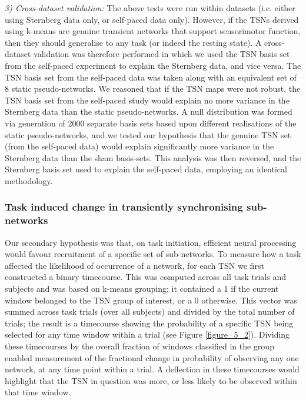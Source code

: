 \textit{3) Cross-dataset validation:}
The above tests were run within datasets (i.e. either using Sternberg data only, or self-paced data only). However, if the TSNs derived using k-means are genuine transient networks that support sensorimotor function, then they should generalise to any task (or indeed the resting state). A cross-dataset validation was therefore performed in which we used the TSN basis set from the self-paced experiment to explain the Sternberg data, and vice versa. The TSN basis set from the self-paced data was taken along with an equivalent set of 8 static pseudo-networks. We reasoned that if the TSN maps were not robust, the TSN basis set from the self-paced study would explain no more variance in the Sternberg data than the static pseudo-networks. A null distribution was formed via generation of 2000 separate basis sets based upon different realisations of the static pseudo-networks, and we tested our hypothesis that the genuine TSN set (from the self-paced data) would explain significantly more variance in the Sternberg data than the sham basis-sets. This analysis was then reversed, and the Sternberg basis set used to explain the self-paced data, employing an identical methodology.

\subsubsection{Task induced change in transiently synchronising sub-networks}
Our secondary hypothesis was that, on task initiation, efficient neural processing would favour recruitment of a specific set of sub-networks. To measure how a task affected the likelihood of occurrence of a network, for each TSN we first constructed a binary timecourse. This was computed across all task trials and subjects and was based on k-means grouping; it contained a 1 if the current window belonged to the TSN group of interest, or a 0 otherwise. This vector was summed across task trials (over all subjects) and divided by the total number of trials; the result is a timecourse showing the probability of a specific TSN being selected for any time window within a trial (see Figure \ref{figure_5_2}). Dividing these timecourses by the overall fraction of windows classified in the group enabled measurement of the fractional change in probability of observing any one network, at any time point within a trial. A deflection in these timecourses would highlight that the TSN in question was more, or less likely to be observed within that time window.

